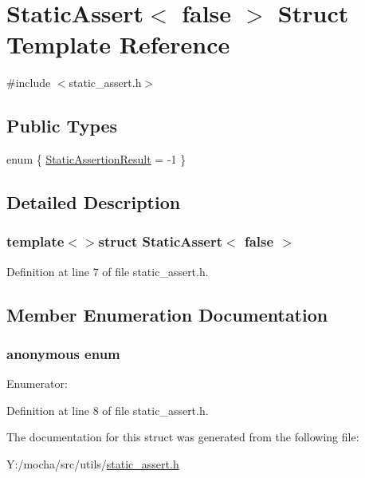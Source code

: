 \hypertarget{struct_static_assert_3_01false_01_4}{
\section{StaticAssert$<$ false $>$ Struct Template Reference}
\label{struct_static_assert_3_01false_01_4}
}


{\ttfamily \#include $<$static\_\-assert.h$>$}

\subsection*{Public Types}
\begin{DoxyCompactItemize}
\item 
enum \{ \hyperlink{struct_static_assert_3_01false_01_4_a8d4d2c9ba5f9eacaf59604eadd6d6c9ea27010c29f1975448315a9f93c2814a30}{StaticAssertionResult} =  -\/1
 \}
\end{DoxyCompactItemize}


\subsection{Detailed Description}
\subsubsection*{template$<$$>$struct StaticAssert$<$ false $>$}



Definition at line 7 of file static\_\-assert.h.



\subsection{Member Enumeration Documentation}
\hypertarget{struct_static_assert_3_01false_01_4_a8d4d2c9ba5f9eacaf59604eadd6d6c9e}{
\subsubsection[{"@26}]{\setlength{\rightskip}{0pt plus 5cm}anonymous enum}}
\label{struct_static_assert_3_01false_01_4_a8d4d2c9ba5f9eacaf59604eadd6d6c9e}
\begin{Desc}
\item[Enumerator: ]\par
\begin{description}
\item[{\em 
\hypertarget{struct_static_assert_3_01false_01_4_a8d4d2c9ba5f9eacaf59604eadd6d6c9ea27010c29f1975448315a9f93c2814a30}{
StaticAssertionResult}
\label{struct_static_assert_3_01false_01_4_a8d4d2c9ba5f9eacaf59604eadd6d6c9ea27010c29f1975448315a9f93c2814a30}
}]\end{description}
\end{Desc}



Definition at line 8 of file static\_\-assert.h.



The documentation for this struct was generated from the following file:\begin{DoxyCompactItemize}
\item 
Y:/mocha/src/utils/\hyperlink{static__assert_8h}{static\_\-assert.h}\end{DoxyCompactItemize}
